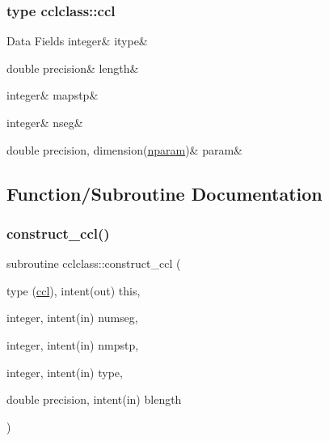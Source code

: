 \subsubsection{type cclclass\+::ccl}
\begin{DoxyFields}{Data Fields}
\mbox{\label{namespacecclclass_ac0907eebcd93b9aa41c33858f394496d}} 
integer&
itype&
\\
\hline

\mbox{\label{namespacecclclass_a128d51138685ec33b8c0c7f6bd89dc81}} 
double precision&
length&
\\
\hline

\mbox{\label{namespacecclclass_a5d663b5eeafc5a924cfe6383143f9b0a}} 
integer&
mapstp&
\\
\hline

\mbox{\label{namespacecclclass_a37e0a279ff69258948ddecf0a4c78045}} 
integer&
nseg&
\\
\hline

\mbox{\label{namespacecclclass_a4b800d069f005c436b2295924f8f7bb9}} 
double precision, dimension(\mbox{\hyperlink{namespacecclclass_adeb399ff41e54cda7bdefa51063c0de6}{nparam}})&
param&
\\
\hline

\end{DoxyFields}


\subsection{Function/\+Subroutine Documentation}
\mbox{\label{namespacecclclass_af38d062f04c18827d1d2a76c17039c58}} 
\subsubsection{\texorpdfstring{construct\_ccl()}{construct\_ccl()}}
{\footnotesize\ttfamily subroutine cclclass\+::construct\+\_\+ccl (\begin{DoxyParamCaption}\item[{type (\mbox{\hyperlink{namespacecclclass_structcclclass_1_1ccl}{ccl}}), intent(out)}]{this,  }\item[{integer, intent(in)}]{numseg,  }\item[{integer, intent(in)}]{nmpstp,  }\item[{integer, intent(in)}]{type,  }\item[{double precision, intent(in)}]{blength }\end{DoxyParamCaption})}

